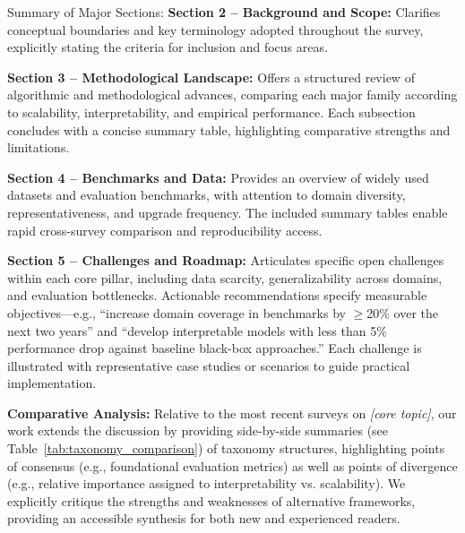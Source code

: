 \documentclass[sigconf]{acmart}
\begin{document}
Summary of Major Sections:
\textbf{Section 2 – Background and Scope:} Clarifies conceptual boundaries and key terminology adopted throughout the survey, explicitly stating the criteria for inclusion and focus areas.

\textbf{Section 3 – Methodological Landscape:} Offers a structured review of algorithmic and methodological advances, comparing each major family according to scalability, interpretability, and empirical performance. Each subsection concludes with a concise summary table, highlighting comparative strengths and limitations.

\textbf{Section 4 – Benchmarks and Data:} Provides an overview of widely used datasets and evaluation benchmarks, with attention to domain diversity, representativeness, and upgrade frequency. The included summary tables enable rapid cross-survey comparison and reproducibility access.

\textbf{Section 5 – Challenges and Roadmap:} Articulates specific open challenges within each core pillar, including data scarcity, generalizability across domains, and evaluation bottlenecks. Actionable recommendations specify measurable objectives—e.g., ``increase domain coverage in benchmarks by $\geq$20\% over the next two years'' and ``develop interpretable models with less than 5\% performance drop against baseline black-box approaches.'' Each challenge is illustrated with representative case studies or scenarios to guide practical implementation.

\textbf{Comparative Analysis:} Relative to the most recent surveys on \emph{[core topic]}, our work extends the discussion by providing side-by-side summaries (see Table~\ref{tab:taxonomy_comparison}) of taxonomy structures, highlighting points of consensus (e.g., foundational evaluation metrics) as well as points of divergence (e.g., relative importance assigned to interpretability vs. scalability). We explicitly critique the strengths and weaknesses of alternative frameworks, providing an accessible synthesis for both new and experienced readers.
\end{document}
